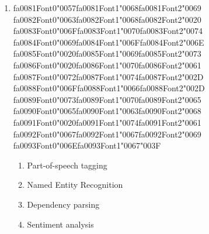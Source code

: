 \documentclass[12pt]{article}
\begin{document}
\begin{enumerate}[label=Q\arabic*.]
\item {\csname fa0081Font0\endcsname\char"0057}{\csname fa0081Font1\endcsname\char"0068}{\csname fa0081Font2\endcsname\char"0069} {\csname fa0082Font0\endcsname\char"0063}{\csname fa0082Font1\endcsname\char"0068}{\csname fa0082Font2\endcsname\char"0020} {\csname fa0083Font0\endcsname\char"006F}{\csname fa0083Font1\endcsname\char"0070}{\csname fa0083Font2\endcsname\char"0074} {\csname fa0084Font0\endcsname\char"0069}{\csname fa0084Font1\endcsname\char"006F}{\csname fa0084Font2\endcsname\char"006E} {\csname fa0085Font0\endcsname\char"0020}{\csname fa0085Font1\endcsname\char"0069}{\csname fa0085Font2\endcsname\char"0073} {\csname fa0086Font0\endcsname\char"0020}{\csname fa0086Font1\endcsname\char"0070}{\csname fa0086Font2\endcsname\char"0061} {\csname fa0087Font0\endcsname\char"0072}{\csname fa0087Font1\endcsname\char"0074}{\csname fa0087Font2\endcsname\char"002D} {\csname fa0088Font0\endcsname\char"006F}{\csname fa0088Font1\endcsname\char"0066}{\csname fa0088Font2\endcsname\char"002D} {\csname fa0089Font0\endcsname\char"0073}{\csname fa0089Font1\endcsname\char"0070}{\csname fa0089Font2\endcsname\char"0065} {\csname fa0090Font0\endcsname\char"0065}{\csname fa0090Font1\endcsname\char"0063}{\csname fa0090Font2\endcsname\char"0068} {\csname fa0091Font0\endcsname\char"0020}{\csname fa0091Font1\endcsname\char"0074}{\csname fa0091Font2\endcsname\char"0061} {\csname fa0092Font0\endcsname\char"0067}{\csname fa0092Font1\endcsname\char"0067}{\csname fa0092Font2\endcsname\char"0069} {\csname fa0093Font0\endcsname\char"006E}{\csname fa0093Font1\endcsname\char"0067}{\char"003F}
\begin{enumerate}[label=(\Alph*)]
    \item Part-of-speech tagging
    \item Named Entity Recognition
    \item Dependency parsing
    \item Sentiment analysis
\end{enumerate}

\end{enumerate}
\end{document}
